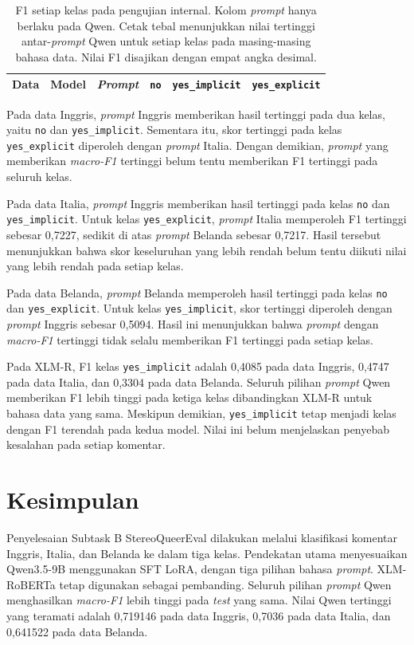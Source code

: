 \documentclass[11pt]{article}
\begin{document}
\begin{table}[t]
\centering
\begin{tabular}{lllrrr}
\toprule
Data & Model & \textit{Prompt} & \texttt{no} & \texttt{yes\_implicit} & \texttt{yes\_explicit} \\
\midrule

\end{tabular}
\caption{F1 setiap kelas pada pengujian internal. Kolom \textit{prompt} hanya berlaku pada Qwen. Cetak tebal menunjukkan nilai tertinggi antar-\textit{prompt} Qwen untuk setiap kelas pada masing-masing bahasa data. Nilai F1 disajikan dengan empat angka desimal.}
\label{tab:classes}
\end{table}

Pada data Inggris, \textit{prompt} Inggris memberikan hasil tertinggi pada dua kelas, yaitu \texttt{no} dan \nolinkurl{yes_implicit}. Sementara itu, skor tertinggi pada kelas \nolinkurl{yes_explicit} diperoleh dengan \textit{prompt} Italia. Dengan demikian, \textit{prompt} yang memberikan \textit{macro-F1} tertinggi belum tentu memberikan F1 tertinggi pada seluruh kelas.

Pada data Italia, \textit{prompt} Inggris memberikan hasil tertinggi pada kelas \texttt{no} dan \nolinkurl{yes_implicit}. Untuk kelas \nolinkurl{yes_explicit}, \textit{prompt} Italia memperoleh F1 tertinggi sebesar 0,7227, sedikit di atas \textit{prompt} Belanda sebesar 0,7217. Hasil tersebut menunjukkan bahwa skor keseluruhan yang lebih rendah belum tentu diikuti nilai yang lebih rendah pada setiap kelas.

Pada data Belanda, \textit{prompt} Belanda memperoleh hasil tertinggi pada kelas \texttt{no} dan \texttt{yes\_explicit}. Untuk kelas \texttt{yes\_implicit}, skor tertinggi diperoleh dengan \textit{prompt} Inggris sebesar 0,5094. Hasil ini menunjukkan bahwa \textit{prompt} dengan \textit{macro-F1} tertinggi tidak selalu memberikan F1 tertinggi pada setiap kelas.

Pada XLM-R, F1 kelas \texttt{yes\_implicit} adalah 0,4085 pada data Inggris, 0,4747 pada data Italia, dan 0,3304 pada data Belanda. Seluruh pilihan \textit{prompt} Qwen memberikan F1 lebih tinggi pada ketiga kelas dibandingkan XLM-R untuk bahasa data yang sama. Meskipun demikian, \texttt{yes\_implicit} tetap menjadi kelas dengan F1 terendah pada kedua model. Nilai ini belum menjelaskan penyebab kesalahan pada setiap komentar.

\section{Kesimpulan}
Penyelesaian Subtask B StereoQueerEval dilakukan melalui klasifikasi komentar Inggris, Italia, dan Belanda ke dalam tiga kelas. Pendekatan utama menyesuaikan Qwen3.5-9B menggunakan SFT LoRA, dengan tiga pilihan bahasa \textit{prompt}. XLM-RoBERTa tetap digunakan sebagai pembanding. Seluruh pilihan \textit{prompt} Qwen menghasilkan \textit{macro-F1} lebih tinggi pada \textit{test} yang sama. Nilai Qwen tertinggi yang teramati adalah 0,719146 pada data Inggris, 0,7036 pada data Italia, dan 0,641522 pada data Belanda.
\end{document}
